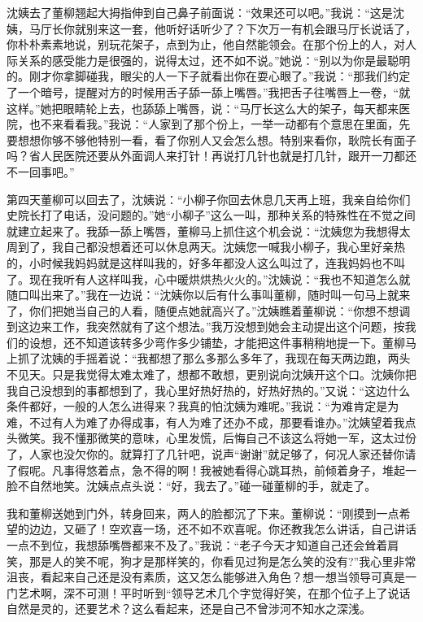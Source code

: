 \documentclass[12pt,oneside]{book}
\begin{document}
沈姨去了董柳翘起大拇指伸到自己鼻子前面说：``效果还可以吧。''我说：``这是沈姨，马厅长你就别来这一套，他听好话听少了？下次万一有机会跟马厅长说话了，你朴朴素素地说，别玩花架子，点到为止，他自然能领会。在那个份上的人，对人际关系的感受能力是很强的，说得太过，还不如不说。''她说：``别以为你是最聪明的。刚才你拿脚碰我，眼尖的人一下子就看出你在耍心眼了。''我说：``那我们约定了一个暗号，提醒对方的时候用舌子舔一舔上嘴唇。''我把舌子往嘴唇上一卷，``就这样。''她把眼睛轮上去，也舔舔上嘴唇，说：``马厅长这么大的架子，每天都来医院，也不来看看我。''我说：``人家到了那个份上，一举一动都有个意思在里面，先要想想你够不够他特别一看，看了你别人又会怎么想。特别来看你，耿院长有面子吗？省人民医院还要从外面调人来打针！再说打几针也就是打几针，跟开一刀都还不一回事吧。''

第四天董柳可以回去了，沈姨说：``小柳子你回去休息几天再上班，我亲自给你们史院长打了电话，没问题的。''她``小柳子''这么一叫，那种关系的特殊性在不觉之间就建立起来了。我舔一舔上嘴唇，董柳马上抓住这个机会说：``沈姨您为我想得太周到了，我自己都没想着还可以休息两天。沈姨您一喊我小柳子，我心里好亲热的，小时候我妈妈就是这样叫我的，好多年都没人这么叫过了，连我妈妈也不叫了。现在我听有人这样叫我，心中暖烘烘热火火的。''沈姨说：``我也不知道怎么就随口叫出来了。''我在一边说：``沈姨你以后有什么事叫董柳，随时叫一句马上就来了，你们把她当自己的人看，随便点她就高兴了。''沈姨瞧着董柳说：``你想不想调到这边来工作，我突然就有了这个想法。''我万没想到她会主动提出这个问题，按我们的设想，还不知道该转多少弯作多少铺垫，才能把这件事稍稍地提一下。董柳马上抓了沈姨的手摇着说：``我都想了那么多那么多年了，我现在每天两边跑，两头不见天。只是我觉得太难太难了，想都不敢想，更别说向沈姨开这个口。沈姨你把我自己没想到的事都想到了，我心里好热好热的，好热好热的。''又说：``这边什么条件都好，一般的人怎么进得来？我真的怕沈姨为难呢。''我说：``为难肯定是为难，不过有人为难了办得成事，有人为难了还办不成，那要看谁办。''沈姨望着我点头微笑。我不懂那微笑的意味，心里发慌，后悔自己不该这么将她一军，这太过份了，人家也没欠你的。就算打了几针吧，说声``谢谢''就足够了，何况人家还替你请了假呢。凡事得悠着点，急不得的啊！我被她看得心跳耳热，前倾着身子，堆起一脸不自然地笑。沈姨点点头说：``好，我去了。''碰一碰董柳的手，就走了。

我和董柳送她到门外，转身回来，两人的脸都沉了下来。董柳说：``刚摸到一点希望的边边，又砸了！空欢喜一场，还不如不欢喜呢。你还教我怎么讲话，自己讲话一点不到位，我想舔嘴唇都来不及了。''我说：``老子今天才知道自己还会耸着肩笑，那是人的笑不呢，狗才是那样笑的，你看见过狗是怎么笑的没有?''我心里非常沮丧，看起来自己还是没有素质，这又怎么能够进入角色？想一想当领导可真是一门艺术啊，深不可测！平时听到``领导艺术几个字觉得好笑，在那个位子上了说话自然是灵的，还要艺术？这么看起来，还是自己不曾涉河不知水之深浅。
\end{document}
